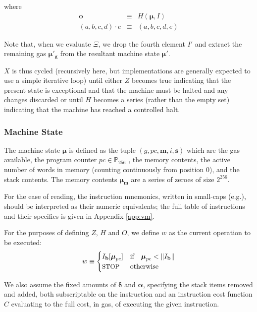 \documentclass[9pt,oneside]{amsart}
\makeatletter
\newcommand*\eg{e.g.\@\xspace}
\makeatother
\begin{document}
\begin{multicols}{2}
where
\begin{eqnarray}
\mathbf{o} & \equiv & H(\boldsymbol{\mu}, I) \\
(a, b, c, d) \cdot e & \equiv & (a, b, c, d, e)
\end{eqnarray}

Note that, when we evaluate $\Xi$, we drop the fourth element $I'$ and extract the remaining gas $\boldsymbol{\mu}'_\mathbf{g}$ from the resultant machine state $\boldsymbol{\mu}'$.

$X$ is thus cycled (recursively here, but implementations are generally expected to use a simple iterative loop) until either $Z$ becomes true indicating that the present state is exceptional and that the machine must be halted and any changes discarded or until $H$ becomes a series (rather than the empty set) indicating that the machine has reached a controlled halt.

\subsubsection{Machine State}
The machine state $\boldsymbol{\mu}$ is defined as the tuple $(g, pc, \mathbf{m}, i, \mathbf{s})$ which are the gas available, the program counter $pc \in \mathbb{P}_{256}$ , the memory contents, the active number of words in memory (counting continuously from position 0), and the stack contents. The memory contents $\boldsymbol{\mu}_\mathbf{m}$ are a series of zeroes of size $2^{256}$.

For the ease of reading, the instruction mnemonics, written in small-caps (\eg {}), should be interpreted as their numeric equivalents; the full table of instructions and their specifics is given in Appendix \ref{app:vm}.

For the purposes of defining $Z$, $H$ and $O$, we define $w$ as the current operation to be executed:
\begin{equation}\label{eq:currentoperation}
w \equiv \begin{cases} I_\mathbf{b}[\boldsymbol{\mu}_{pc}] & \text{if} \quad \boldsymbol{\mu}_{pc} < \lVert I_\mathbf{b} \rVert \\
\text{\small STOP} & \text{otherwise}
\end{cases}
\end{equation}

We also assume the fixed amounts of $\mathbf{\delta}$ and $\mathbf{\alpha}$, specifying the stack items removed and added, both subscriptable on the instruction and an instruction cost function $C$ evaluating to the full cost, in gas, of executing the given instruction.


\end{multicols}
\end{document}

